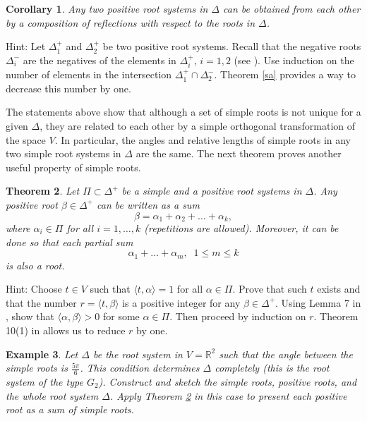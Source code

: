 \documentclass[11pt]{amsart}
\newcommand{\R}{\mathbb R}
\newtheorem{theorem}{Theorem}
\newtheorem{corollary}[theorem]{Corollary}
\newtheorem{example}[theorem]{Example}
\begin{document}
\begin{corollary} Any two positive root systems in $\Delta$ can be obtained 
from each other by a composition of reflections with respect to the roots 
in $\Delta$. 
\end{corollary} 

Hint: Let $\Delta^+_1 $ and $\Delta^+_2$ be two positive root systems. 
Recall that the negative roots $\Delta^-_i$ are the negatives of 
the elements in $\Delta^+_i$, $i=1,2$ (see \cite{3}). 
Use induction on the number of elements in the intersection 
$\Delta^+_1 \cap \Delta^-_2$. Theorem \ref{sa} provides a way to decrease 
this number by one. 

The statements above show that although a set of simple roots 
is not unique for a given $\Delta$, they are related to each other by 
a simple orthogonal transformation of the space $V$. In particular, 
the angles and relative lengths of simple roots in any two simple 
root systems in $\Delta$ are the same. 
The next theorem proves another useful 
property of simple roots. 

\begin{theorem} \label{seq}
Let $\Pi \subset \Delta^+$ be a simple and a positive 
root systems in $\Delta$.  
Any positive root $\beta \in \Delta^+$ can be written as a sum 
$$ \beta = \alpha_1 + \alpha_2 + \ldots + \alpha_k, $$
where $\alpha_i \in \Pi$ for all $i =1, \ldots , k$ (repetitions are allowed). 
Moreover, 
it can be done so that each partial sum 
$$ \alpha_1 + \ldots + \alpha_m, \;\; 1 \leq m \leq k $$ 
is also a root.      
\end{theorem} 

Hint: Choose $t \in V$ such that $\langle t, \alpha \rangle =1$ for 
all $\alpha \in \Pi$. Prove that such $t$ exists and that the number 
$r=\langle t, \beta \rangle $ 
is a positive integer for any $\beta \in \Delta^+$. Using Lemma 7 in 
\cite{3}, show that $\langle \alpha, \beta \rangle >0$ for some 
$\alpha \in \Pi$. 
Then proceed by induction on $r$. Theorem 10(1) in \cite{2} allows 
us to reduce $r$ by one.  

\begin{example} Let $\Delta$ be the root system in $V= \R^2$  
such that the angle between the simple roots is $\frac{5\pi}{6}$.
This condition determines $\Delta$ completely (this is the root system 
of the type $G_2$). 
 Construct and sketch the simple roots, 
positive roots, and the whole root system $\Delta$. Apply 
Theorem \ref{seq} in this case to present each positive root 
as a sum of simple roots. 
\end{example} 
\end{document}
